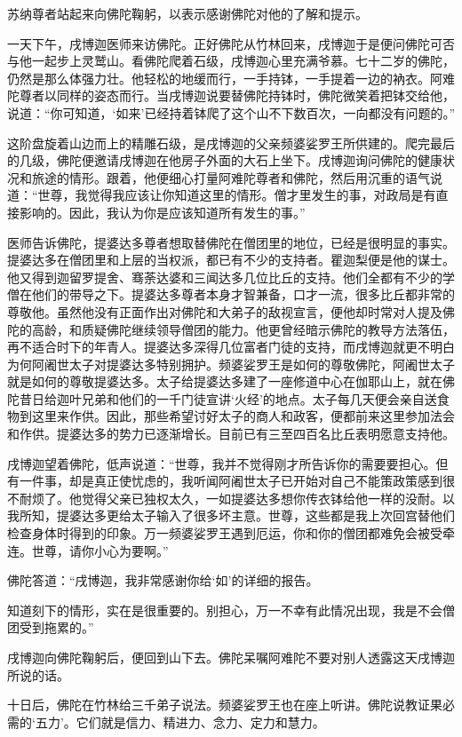 \documentclass[12pt,twoside,openany]{book}
\begin{document}
苏纳尊者站起来向佛陀鞠躬，以表示感谢佛陀对他的了解和提示。

一天下午，戌博迦医师来访佛陀。正好佛陀从竹林回来，戌博迦于是便问佛陀可否与他一起步上灵鹫山。看佛陀爬着石级，戌博迦心里充满爷慕。七十二岁的佛陀，仍然是那么体强力壮。他轻松的地缓而行，一手持钵，一手提着一边的衲衣。阿难陀尊者以同样的姿态而行。当戌博迦说要替佛陀持钵时，佛陀微笑着把钵交给他，说道：“你可知道，‘如来’已经持着钵爬了这个山不下数百次，一向都没有问题的。”

这阶盘旋着山边而上的精雕石级，是戌博迦的父亲频婆娑罗王所供建的。爬完最后的几级，佛陀便邀请戌博迦在他房子外面的大石上坐下。戌博迦询问佛陀的健康状况和旅途的情形。跟着，他便细心打量阿难陀尊者和佛陀，然后用沉重的语气说道：“世尊，我觉得我应该让你知道这里的情形。僧才里发生的事，对政局是有直接影响的。因此，我认为你是应该知道所有发生的事。”

医师告诉佛陀，提婆达多尊者想取替佛陀在僧团里的地位，已经是很明显的事实。提婆达多在僧团里和上层的当权派，都已有不少的支持者。瞿迦梨便是他的谋士。他又得到迦留罗提舍、骞荼达婆和三闻达多几位比丘的支持。他们全都有不少的学僧在他们的带导之下。提婆达多尊者本身才智兼备，口才一流，很多比丘都非常的尊敬他。虽然他没有正面作出对佛陀和大弟子的敌视宣言，便他却时常对人提及佛陀的高龄，和质疑佛陀继续领导僧团的能力。他更曾经暗示佛陀的教导方法落伍，再不适合时下的年青人。提婆达多深得几位富者门徒的支持，而戌博迦就更不明白为何阿阇世太子对提婆达多特别拥护。频婆娑罗王是如何的尊敬佛陀，阿阇世太子就是如何的尊敬提婆达多。太子给提婆达多建了一座修道中心在伽耶山上，就在佛陀昔日给迦叶兄弟和他们的一千门徒宣讲‘火经’的地点。太子每几天便会亲自送食物到这里来作供。因此，那些希望讨好太子的商人和政客，便都前来这里参加法会和作供。提婆达多的势力已逐渐增长。目前已有三至四百名比丘表明愿意支持他。

戌博迦望着佛陀，低声说道：“世尊，我并不觉得刚才所告诉你的需要要担心。但有一件事，却是真正使忧虑的，我听闻阿阇世太子已开始对自己不能策政策感到很不耐烦了。他觉得父亲已独权太久，一如提婆达多想你传衣钵给他一样的没耐。以我所知，提婆达多更给太子输入了很多坏主意。世尊，这些都是我上次回宫替他们检查身体时得到的印象。万一频婆娑罗王遇到厄运，你和你的僧团都难免会被受牵连。世尊，请你小心为要啊。”

佛陀答道：“戌博迦，我非常感谢你给‘如’的详细的报告。

知道刻下的情形，实在是很重要的。别担心，万一不幸有此情况出现，我是不会僧团受到拖累的。”

戌博迦向佛陀鞠躬后，便回到山下去。佛陀呆嘱阿难陀不要对别人透露这天戌博迦所说的话。

十日后，佛陀在竹林给三千弟子说法。频婆娑罗王也在座上听讲。佛陀说教证果必需的‘五力’。它们就是信力、精进力、念力、定力和慧力。
\end{document}

